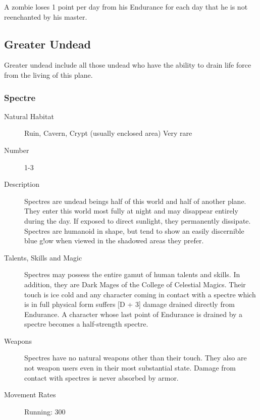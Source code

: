 \begin{multicols}{2}
\begin{description}
\setlength\itemsep{0pt}

\item[Comments] A zombie loses 1 point per day from his Endurance for each
day that he is not reenchanted by his master.

\end{description}

\subsection{Greater Undead}
Greater undead include all those undead who have the ability to drain
life force from the living of this plane.


\subsubsection{Spectre}

\begin{description}
\item[Natural Habitat] Ruin, Cavern, Crypt (usually enclosed area) Very rare

\item[Number] 1-3

\item[Description] Spectres are undead beings half of this world and half
of another plane. They enter this world most fully at night and may
disappear entirely during the day. If exposed to direct sunlight, they
permanently dissipate. Spectres are humanoid in shape, but tend to
show an easily discernible blue g!ow when viewed in the shadowed areas
they prefer.

\item[Talents, Skills and Magic] Spectres may possess the entire gamut of human talents and
skills. In addition, they are Dark Mages of the College of Celestial
Magics. Their touch is ice cold and any character coming in contact
with a spectre which is in full physical form suffers [D + 3] damage
drained directly from Endurance. A character whose last point of
Endurance is drained by a spectre becomes a half-strength spectre.

\item[Weapons] Spectres have no natural weapons other than their
touch. They also are not weapon users even in their most substantial
state. Damage from contact with spectres is never absorbed by armor.

\item[Movement Rates]  Running: 300


\end{description}
\end{multicols}
